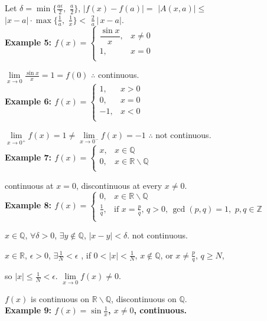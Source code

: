 \documentclass[12pt]{article}
\newcommand{\abs}[1]{\left| #1 \right|}
\theoremstyle{plain}
\newcommand{\dlim}{\displaystyle\lim\limits}
\begin{document}
{    Let $\delta = \min \{\frac {a\epsilon}2, \,\,\frac a2\}$, 
    $\abs{f(x)-f(a)}=$ $\abs{A(x,a)}
    \leq $ $\abs{x-a} \cdot \max\{\frac 1a,\,\, \frac 1x\}
    <\,\,\frac 2a\, \abs{\,x-a}$.\\


    \textbf{Example 5: $f(x) = 
        \begin{cases}
            \dfrac{\sin x}x, &x\neq 0\\
            1 , &x=0\\
        \end{cases}$}

    $\dlim_{x\to 0} \frac {\sin x} x = 1 = f(0)$ \qquad
    $\therefore$ continuous.\\

    \textbf{Example 6: $f(x)=
        \begin{cases}
            1, &x>0\\
            0, &x=0\\
            -1, &x<0\\
        \end{cases}$}

    $\dlim_{x\to 0^+} f(x)=1\neq \dlim_{x\to 0^-} f(x) = -1$ \qquad
    $\therefore$ not continuous.\\

    \textbf{Example 7: $f(x)= 
        \begin{cases}
            x, &x\in \mathbb{Q}\\
            0, &x\in \mathbb{R\backslash Q}\\
        \end{cases}$}

	continuous at $x=0$, discontinuous at every $x\neq 0$.\\

    \textbf{Example 8: $f(x) = \begin{cases}
        0, &x\in \mathbb{R}\backslash \mathbb{Q}\\
        \frac 1q, &\text{if } x=\frac pq, 
        \,q>0, \,\gcd (p,q)=1, \,\,p,q \in \mathbb{Z}\\
    \end{cases}$}

    $x\in\mathbb{Q}$, $\forall \delta >0$, $\exists y \not\in \mathbb{Q}$,
    $\abs{x-y}<\delta$. not continuous.

    $x\in\mathbb{R}$, $\epsilon > 0$, 
    $\exists \frac 1N < \epsilon$ , if $0<\abs x<\frac1N$, 
    $x \not\in \mathbb{Q}$, or $x\neq \frac pq$, $q\geq N$,

    so $\abs{x}\leq \frac 1N<\epsilon$. $\dlim_{x\to 0} f(x) \neq 0$.
    
    $f(x)$ is continuous on $\mathbb{R}\backslash \mathbb{Q}$, 
    discontinuous on $\mathbb{Q}$.\\
    


  \textbf{Example 9: $f(x) = \sin \frac 1x$, $x\neq 0$, continuous.}}\\\\
\end{document}
